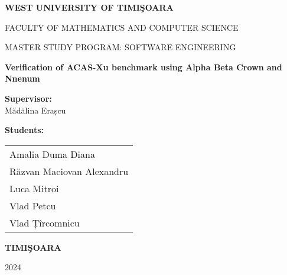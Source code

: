 \documentclass[12pt,a4paper,oneside]{article}
\theoremstyle{definition}
\theoremstyle{remark}
\begin{document}
\sloppy

\thispagestyle{empty}

\newpage
\thispagestyle{empty}
\begin{center}
{\large{\bf WEST UNIVERSITY OF TIMI\c SOARA
		
FACULTY OF MATHEMATICS AND COMPUTER SCIENCE
		
MASTER STUDY PROGRAM:  SOFTWARE ENGINEERING}}

\vspace{200pt}
{\huge {\bf Verification of ACAS-Xu benchmark using Alpha Beta Crown and Nnenum }}

\vspace{153pt}
\end{center}

\noindent
\begin{minipage}[t]{0.45\textwidth}
    \textbf{Supervisor:} \\
    Mădălina Erașcu \\
\end{minipage}%
\hfill
\begin{minipage}[t]{0.35\textwidth}
    \textbf{Students:} \\
    \begin{tabular}[t]{l}
        Amalia Duma Diana \\
        Răzvan Maciovan Alexandru \\
        Luca Mitroi \\
        Vlad Petcu \\
        Vlad Țîrcomnicu \\
    \end{tabular}
\end{minipage}

 

\vfill
\begin{center}
{\bf TIMI\c SOARA

2024}

\end{center}






\newpage


\end{document}
